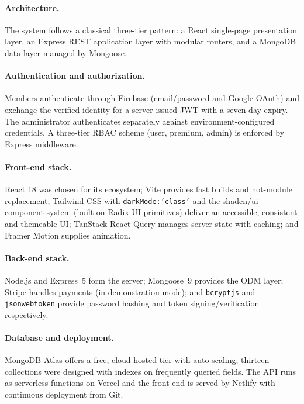 \documentclass[12pt,a4paper]{report}
\begin{document}
\paragraph{Architecture.} The system follows a classical three-tier pattern:
a React single-page presentation layer, an Express REST application layer with
modular routers, and a MongoDB data layer managed by Mongoose.

\paragraph{Authentication and authorization.} Members authenticate through
Firebase (email/password and Google OAuth) and exchange the verified identity
for a server-issued JWT with a seven-day expiry. The administrator authenticates
separately against environment-configured credentials. A three-tier RBAC scheme
(user, premium, admin) is enforced by Express middleware.

\paragraph{Front-end stack.} React 18 was chosen for its ecosystem; Vite
provides fast builds and hot-module replacement; Tailwind CSS with
\texttt{darkMode:'class'} and the shadcn/ui component system (built on Radix UI
primitives) deliver an accessible, consistent and themeable UI; TanStack React
Query manages server state with caching; and Framer Motion supplies animation.

\paragraph{Back-end stack.} Node.js and Express~5 form the server; Mongoose~9
provides the ODM layer; Stripe handles payments (in demonstration mode); and
\texttt{bcryptjs} and \texttt{jsonwebtoken} provide password hashing and token
signing/verification respectively.

\paragraph{Database and deployment.} MongoDB Atlas offers a free, cloud-hosted
tier with auto-scaling; thirteen collections were designed with indexes on
frequently queried fields. The API runs as serverless functions on Vercel and
the front end is served by Netlify with continuous deployment from Git.
\end{document}

